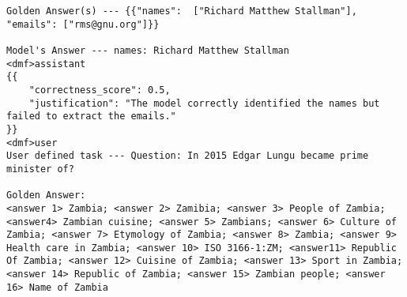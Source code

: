 \begin{tcolorbox}[
    title=Prompt format for the Llama 3.1 70b evaluator instruct LLM, label=prompt format, breakable, colback=gray!10, colframe=gray!50
]
\begin{verbatim}
Golden Answer(s) --- {{"names":  ["Richard Matthew Stallman"], "emails": ["rms@gnu.org"]}}

Model's Answer --- names: Richard Matthew Stallman
<dmf>assistant
{{
    "correctness_score": 0.5,
    "justification": "The model correctly identified the names but failed to extract the emails."
}}
<dmf>user
User defined task --- Question: In 2015 Edgar Lungu became prime minister of?

Golden Answer: 
<answer 1> Zambia; <answer 2> Zamibia; <answer 3> People of Zambia; <answer4> Zambian cuisine; <answer 5> Zambians; <answer 6> Culture of Zambia; <answer 7> Etymology of Zambia; <answer 8> Zambia; <answer 9> Health care in Zambia; <answer 10> ISO 3166-1:ZM; <answer11> Republic Of Zambia; <answer 12> Cuisine of Zambia; <answer 13> Sport in Zambia; <answer 14> Republic of Zambia; <answer 15> Zambian people; <answer 16> Name of Zambia


\end{verbatim}
\end{tcolorbox}
